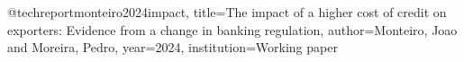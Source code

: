@techreport{monteiro2024impact,
  title={The impact of a higher cost of credit on exporters: Evidence from a change in banking regulation},
  author={Monteiro, Joao and Moreira, Pedro},
  year={2024},
  institution={Working paper}
}
